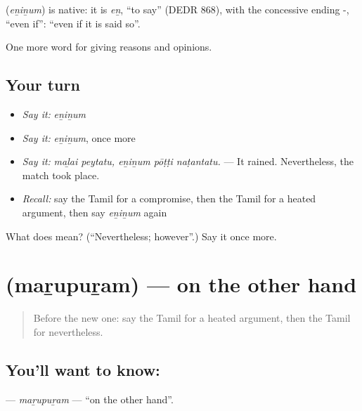 \begin{cousinweb}
\textbf{} (\emph{eṉiṉum}) is native: it is \emph{eṉ}, \textquotedblleft{}to say\textquotedblright{} (DEDR 868), with the concessive ending -, \textquotedblleft{}even if\textquotedblright{}: \textquotedblleft{}even if it is said so\textquotedblright{}.
\end{cousinweb}

\begin{grammarlens}[title={What you've built}]
One more word for giving reasons and opinions.
\end{grammarlens}

\subsection*{Your turn}
\begin{itemize}
\raggedright
  \item \emph{Say it:} \emph{eṉiṉum}
  \item \emph{Say it:} \emph{eṉiṉum}, once more
  \item \emph{Say it:} \emph{maḻai peytatu, eṉiṉum pōṭṭi naṭantatu.} — It rained. Nevertheless, the match took place.
  \item \emph{Recall:} say the Tamil for a compromise, then the Tamil for a heated argument, then say \emph{eṉiṉum} again
\end{itemize}

\begin{tcolorbox}[breakable,colback=teal!4,colframe=teal!35!black,title={Before you move on}]
What does  mean? (\textquotedblleft{}Nevertheless; however\textquotedblright{}.) Say it once more.
\end{tcolorbox}
\section[\texorpdfstring{\ta{மறுபுறம்} (maṟupuṟam)}{மறுபுறம் (maṟupuṟam)}]{ (maṟupuṟam) — on the other hand}

\label{lesson:TA-C357-marupuram}



\begin{quote}
Before the new one: say the Tamil for a heated argument, then the Tamil for nevertheless.
\end{quote}

\subsection*{You'll want to know: }
\textbf{} — \emph{maṟupuṟam} — \textquotedblleft{}on the other hand\textquotedblright{}.

